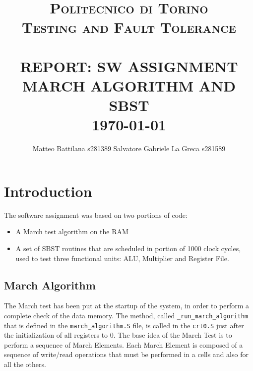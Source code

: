 \documentclass[paper=a4, fontsize=10pt]{scrartcl}	%
\title{	\normalsize \textsc{Politecnico di Torino\\Testing and Fault Tolerance} 	%
	\\[2.0cm]								%
	\HRule{0.5pt} \\						%
	\LARGE \textbf{\uppercase{Report: SW ASSIGNMENT\\March Algorithm and SBST}}	%
	\HRule{2pt} \\ [0.5cm]		%
	\normalsize 
	\today %
}
\author{
	Matteo Battilana s281389\newline
	Salvatore Gabriele La Greca s281589
}
\makeatletter
\def\printtitle{%
	{\centering \@title\par}}
\def\printauthor{%
	{\centering \large \@author}}
\makeatother
\begin{document}
	\thispagestyle{empty}		%
	
	\printtitle					%
	\vfill
	\printauthor				%
	\newpage
	\setcounter{page}{1}		%
	\section{Introduction}
	The software assignment was based on two portions of code:
	\begin{itemize}
		\itemsep0sp
		\item A March test algorithm on the RAM
		\item A set of SBST routines that are scheduled in portion of 1000 clock cycles, used to test three functional units: ALU, Multiplier and Register File.
	\end{itemize}

	\subsection{March Algorithm}
	The March test has been put at the startup of the system, in order to perform a complete check of the data memory.
	The method, called \texttt{\_run\_march\_algorithm} that is defined in the \texttt{march\_algorithm.S} file, is called in the \texttt{crt0.S} just after the initialization of all registers to 0.\newline\newline
	The base idea of the March Test is to perform a sequence of March Elements. Each March Element is composed of a sequence of write/read operations that must be performed in a cells and also for all the others.
	
\end{document}
